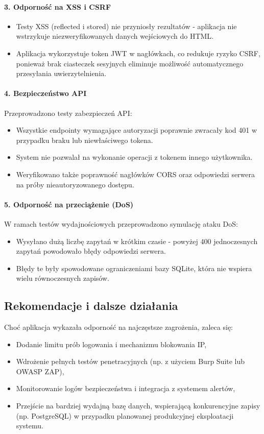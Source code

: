 \paragraph{3. Odporność na XSS i CSRF}
\begin{itemize}
    \item Testy XSS (reflected i stored) nie przyniosły rezultatów - aplikacja nie wstrzykuje niezweryfikowanych danych wejściowych do HTML.
    \item Aplikacja wykorzystuje token JWT w nagłówkach, co redukuje ryzyko CSRF, ponieważ brak ciasteczek sesyjnych eliminuje możliwość automatycznego przesyłania uwierzytelnienia.
\end{itemize}

\paragraph{4. Bezpieczeństwo API}
Przeprowadzono testy zabezpieczeń API:
\begin{itemize}
    \item Wszystkie endpointy wymagające autoryzacji poprawnie zwracały kod 401 w przypadku braku lub niewłaściwego tokena.
    \item System nie pozwalał na wykonanie operacji z tokenem innego użytkownika.
    \item Weryfikowano także poprawność nagłówków CORS oraz odpowiedzi serwera na próby nieautoryzowanego dostępu.
\end{itemize}

\paragraph{5. Odporność na przeciążenie (DoS)}
W ramach testów wydajnościowych przeprowadzono symulację ataku DoS:
\begin{itemize}
    \item Wysyłano dużą liczbę zapytań w krótkim czasie - powyżej 400 jednoczesnych zapytań powodowało błędy odpowiedzi serwera.
    \item Błędy te były spowodowane ograniczeniami bazy SQLite, która nie wspiera wielu równoczesnych zapisów.
\end{itemize}

\subsection{Rekomendacje i dalsze działania}
Choć aplikacja wykazała odporność na najczęstsze zagrożenia, zaleca się:
\begin{itemize}
    \item Dodanie limitu prób logowania i mechanizmu blokowania IP,
    \item Wdrożenie pełnych testów penetracyjnych (np. z użyciem Burp Suite \cite{BurpSuite} lub OWASP ZAP\cite{ZAP}),
    \item Monitorowanie logów bezpieczeństwa i integracja z systemem alertów,
    \item Przejście na bardziej wydajną bazę danych, wspierającą konkurencyjne zapisy (np. PostgreSQL) w przypadku planowanej produkcyjnej eksploatacji systemu.
\end{itemize}


